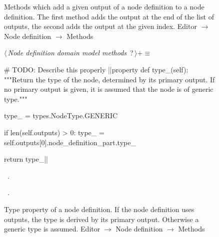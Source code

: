 \documentclass[%
    a4paper,    %
    justified,  %
    nobib,      %
    openany     %
]{tufte-book}
\begin{document}
\begin{figure}
\begin{flushleft}
\begin{minipage}{\linewidth}
\begin{list}{}{\setlength{\itemsep}{-\parsep}\setlength{\itemindent}{-\leftmargin}}
\item{}
\end{list}
\end{minipage}\vspace{4ex}
\end{flushleft}
\caption{Methods which add a given output of a node definition to a node
  definition. The first method adds the output at the end of the list of
  outputs, the second adds the output at the given index.
  \newline{}\newline{}Editor $\rightarrow$ Node definition $\rightarrow$
  Methods}
\label{editor:lst:node-definition:methods:add-output}
\end{figure}

\begin{figure}
\begin{flushleft} \small
\begin{minipage}{\linewidth}\label{scrap144}\raggedright\small
{} $\langle\,${\itshape Node definition domain model methods}\nobreak\ {\footnotesize {?}}$\,\rangle+\equiv$
\vspace{-1ex}
\begin{pythoncode}
# TODO: Describe this properly
|\normalfont{}\fontfamily{}|property
def type_(self):
    """Return the type of the node, determined by its primary output.
    If no primary output is given, it is assumed that the node is of
    generic type."""

    type_ = types.NodeType.GENERIC

    if len(self.outputs) > 0:
        type_ = self.outputs[0].node_definition_part.type_

    return type_|\NWsep|
\end{pythoncode}
\vspace{1.5ex}
\footnotesize
\begin{list}{}{\setlength{\itemsep}{-\parsep}\setlength{\itemindent}{-\leftmargin}}
\item \NWtxtMacroDefBy\ .
\item \NWtxtMacroRefIn\ .

\item{}
\end{list}
\end{minipage}\vspace{4ex}
\end{flushleft}
\caption{Type property of a node definition. If the node definition uses
  outputs, the type is derived by its primary output. Otherwise a generic type
  is assumed.
  \newline{}\newline{}Editor $\rightarrow$ Node definition $\rightarrow$
  Methods}
\label{editor:lst:node-definition:methods:type}
\end{figure}
\end{document}
